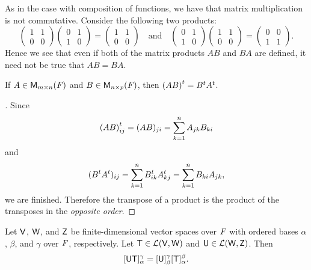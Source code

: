 \begin{note}
	As in the case with composition of functions, we have that matrix multiplication is not commutative. Consider the following two products:
	\[
		\begin{pmatrix}
			1 & 1 \\
			0 & 0
		\end{pmatrix} \begin{pmatrix}
			0 & 1 \\
			1 & 0
		\end{pmatrix} = \begin{pmatrix}
			1 & 1 \\
			0 & 0
		\end{pmatrix} \quad \text{and} \quad \begin{pmatrix}
			0 & 1 \\
			1 & 0
		\end{pmatrix} \begin{pmatrix}
			1 & 1 \\
			0 & 0
		\end{pmatrix} = \begin{pmatrix}
			0 & 0 \\
			1 & 1
		\end{pmatrix}.
	\]
	Hence we see that even if both of the matrix products \(AB\) and \(BA\) are defined, it need not be true that \(AB = BA\).
\end{note}

\begin{eg}\label{2.3.2}
	If \(A \in \MS\) and \(B \in \ms[n][p][\F]\), then \({(AB)}^{t} = {B}^{t} {A}^{t}\).
\end{eg}

\begin{proof}[]
	Since
	\[
		{(AB)}^{t}_{i j} = (AB)_{j i} = \sum_{k = 1}^n A_{j k} B_{k i}
	\]
	and
	\[
		({B}^{t} {A}^{t})_{i j} = \sum_{k = 1}^n {B}^{t}_{i k} {A}^{t}_{k j} = \sum_{k = 1}^n B_{k i} A_{j k},
	\]
	we are finished.
	Therefore the transpose of a product is the product of the transposes in the \emph{opposite order}.
\end{proof}

\begin{thm}\label{2.11}
	Let \(\mathsf{V}\), \(\mathsf{W}\), and \(\mathsf{Z}\) be finite-dimensional vector spaces over \(\mathit{F}\) with ordered bases \(\alpha\), \(\beta\), and \(\gamma\) over \(\mathit{F}\), respectively.
	Let \(\mathsf{T} \in \mathcal{L}(\mathsf{V}, \mathsf{W})\) and \(\mathsf{U} \in \mathcal{L}(\mathsf{W}, \mathsf{Z})\).
	Then
	\[
		[\mathsf{U} \mathsf{T}]_{\alpha}^{\gamma} = [\mathsf{U}]_{\beta}^{\gamma} [\mathsf{T}]_{\alpha}^{\beta}.
	\]
\end{thm}

